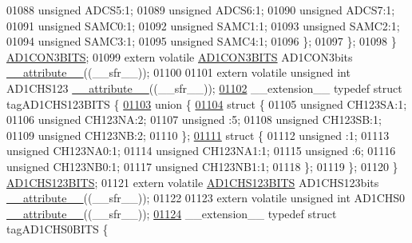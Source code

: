 \begin{DoxyCode}
01088       \textcolor{keywordtype}{unsigned} ADCS5:1;
01089       \textcolor{keywordtype}{unsigned} ADCS6:1;
01090       \textcolor{keywordtype}{unsigned} ADCS7:1;
01091       \textcolor{keywordtype}{unsigned} SAMC0:1;
01092       \textcolor{keywordtype}{unsigned} SAMC1:1;
01093       \textcolor{keywordtype}{unsigned} SAMC2:1;
01094       \textcolor{keywordtype}{unsigned} SAMC3:1;
01095       \textcolor{keywordtype}{unsigned} SAMC4:1;
01096     \};
01097   \};
01098 \} \hyperlink{a00008_d2/d1f/a00083}{AD1CON3BITS};
01099 \textcolor{keyword}{extern} \textcolor{keyword}{volatile} \hyperlink{a00008_d2/d1f/a00083}{AD1CON3BITS} AD1CON3bits \hyperlink{a00009_a493c46f03454991ccc5aa7a6e1dfb2a7}{\_\_attribute\_\_}((\_\_sfr\_\_));
01100 
01101 \textcolor{keyword}{extern} \textcolor{keyword}{volatile} \textcolor{keywordtype}{unsigned} \textcolor{keywordtype}{int}  AD1CHS123 \hyperlink{a00009_a493c46f03454991ccc5aa7a6e1dfb2a7}{\_\_attribute\_\_}((\_\_sfr\_\_));
\hypertarget{a00009_source_l01102}{}\hyperlink{a00008}{01102} \_\_extension\_\_ \textcolor{keyword}{typedef} \textcolor{keyword}{struct }tagAD1CHS123BITS \{
\hypertarget{a00009_source_l01103}{}\hyperlink{a00009}{01103}   \textcolor{keyword}{union }\{
\hypertarget{a00009_source_l01104}{}\hyperlink{a00009}{01104}     \textcolor{keyword}{struct }\{
01105       \textcolor{keywordtype}{unsigned} CH123SA:1;
01106       \textcolor{keywordtype}{unsigned} CH123NA:2;
01107       \textcolor{keywordtype}{unsigned} :5;
01108       \textcolor{keywordtype}{unsigned} CH123SB:1;
01109       \textcolor{keywordtype}{unsigned} CH123NB:2;
01110     \};
\hypertarget{a00009_source_l01111}{}\hyperlink{a00009}{01111}     \textcolor{keyword}{struct }\{
01112       \textcolor{keywordtype}{unsigned} :1;
01113       \textcolor{keywordtype}{unsigned} CH123NA0:1;
01114       \textcolor{keywordtype}{unsigned} CH123NA1:1;
01115       \textcolor{keywordtype}{unsigned} :6;
01116       \textcolor{keywordtype}{unsigned} CH123NB0:1;
01117       \textcolor{keywordtype}{unsigned} CH123NB1:1;
01118     \};
01119   \};
01120 \} \hyperlink{a00008_db/db6/a00074}{AD1CHS123BITS};
01121 \textcolor{keyword}{extern} \textcolor{keyword}{volatile} \hyperlink{a00008_db/db6/a00074}{AD1CHS123BITS} AD1CHS123bits \hyperlink{a00009_a493c46f03454991ccc5aa7a6e1dfb2a7}{\_\_attribute\_\_}((\_\_sfr\_\_));
01122 
01123 \textcolor{keyword}{extern} \textcolor{keyword}{volatile} \textcolor{keywordtype}{unsigned} \textcolor{keywordtype}{int}  AD1CHS0 \hyperlink{a00009_a493c46f03454991ccc5aa7a6e1dfb2a7}{\_\_attribute\_\_}((\_\_sfr\_\_));
\hypertarget{a00009_source_l01124}{}\hyperlink{a00008}{01124} \_\_extension\_\_ \textcolor{keyword}{typedef} \textcolor{keyword}{struct }tagAD1CHS0BITS \{

\end{DoxyCode}
